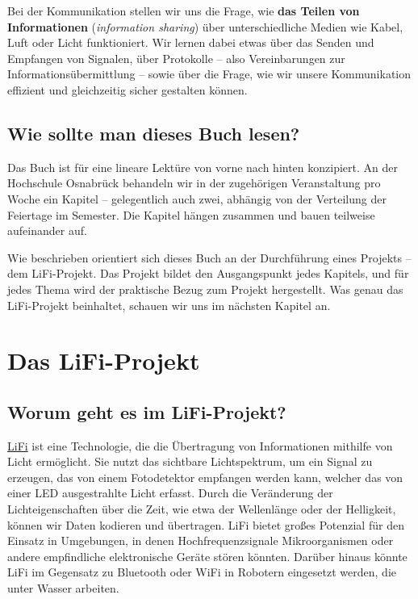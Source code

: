 \documentclass[
  letterpaper,
  DIV=11]{scrreprt}
\begin{document}
Bei der Kommunikation stellen wir uns die Frage, wie \textbf{das Teilen
von Informationen} (\emph{information sharing}) über unterschiedliche
Medien wie Kabel, Luft oder Licht funktioniert. Wir lernen dabei etwas
über das Senden und Empfangen von Signalen, über Protokolle -- also
Vereinbarungen zur Informationsübermittlung -- sowie über die Frage, wie
wir unsere Kommunikation effizient und gleichzeitig sicher gestalten
können.

\section*{Wie sollte man dieses Buch
lesen?}\label{wie-sollte-man-dieses-buch-lesen}


Das Buch ist für eine lineare Lektüre von vorne nach hinten konzipiert.
An der Hochschule Osnabrück behandeln wir in der zugehörigen
Veranstaltung pro Woche ein Kapitel -- gelegentlich auch zwei, abhängig
von der Verteilung der Feiertage im Semester. Die Kapitel hängen
zusammen und bauen teilweise aufeinander auf.

Wie beschrieben orientiert sich dieses Buch an der Durchführung eines
Projekts -- dem LiFi-Projekt. Das Projekt bildet den Ausgangspunkt jedes
Kapitels, und für jedes Thema wird der praktische Bezug zum Projekt
hergestellt. Was genau das LiFi-Projekt beinhaltet, schauen wir uns im
nächsten Kapitel an.


\chapter*{Das LiFi-Projekt}\label{sec-lifi-project}


\section*{Worum geht es im
LiFi-Projekt?}\label{worum-geht-es-im-lifi-projekt}


\href{https://en.wikipedia.org/wiki/Li-Fi}{LiFi} ist eine Technologie,
die die Übertragung von Informationen mithilfe von Licht ermöglicht. Sie
nutzt das sichtbare Lichtspektrum, um ein Signal zu erzeugen, das von
einem Fotodetektor empfangen werden kann, welcher das von einer LED
ausgestrahlte Licht erfasst. Durch die Veränderung der
Lichteigenschaften über die Zeit, wie etwa der Wellenlänge oder der
Helligkeit, können wir Daten kodieren und übertragen. LiFi bietet großes
Potenzial für den Einsatz in Umgebungen, in denen Hochfrequenzsignale
Mikroorganismen oder andere empfindliche elektronische Geräte stören
könnten. Darüber hinaus könnte LiFi im Gegensatz zu Bluetooth oder WiFi
in Robotern eingesetzt werden, die unter Wasser arbeiten.
\end{document}
